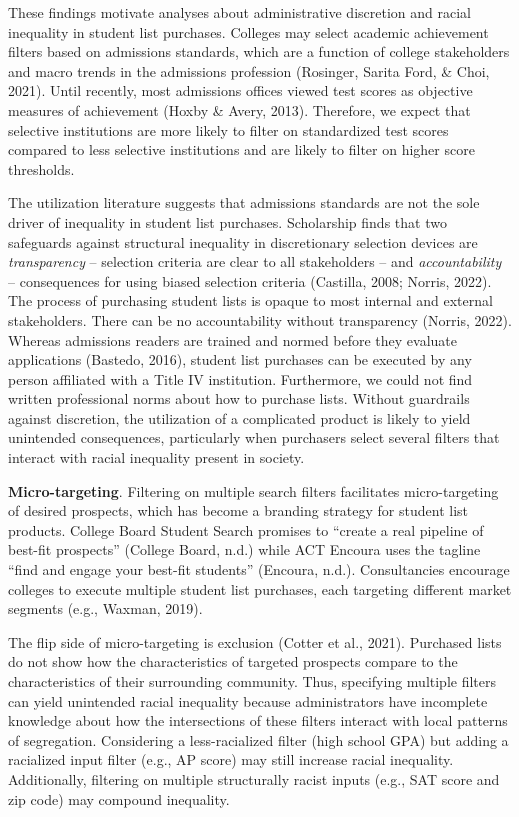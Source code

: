 \documentclass[
  12pt,
]{article}
\begin{document}
These findings motivate analyses about administrative discretion and racial inequality in student list purchases. Colleges may select academic achievement filters based on admissions standards, which are a function of college stakeholders and macro trends in the admissions profession (Rosinger, Sarita Ford, \& Choi, 2021). Until recently, most admissions offices viewed test scores as objective measures of achievement (Hoxby \& Avery, 2013). Therefore, we expect that selective institutions are more likely to filter on standardized test scores compared to less selective institutions and are likely to filter on higher score thresholds.

The utilization literature suggests that admissions standards are not the sole driver of inequality in student list purchases. Scholarship finds that two safeguards against structural inequality in discretionary selection devices are \emph{transparency} -- selection criteria are clear to all stakeholders -- and \emph{accountability} -- consequences for using biased selection criteria (Castilla, 2008; Norris, 2022). The process of purchasing student lists is opaque to most internal and external stakeholders. There can be no accountability without transparency (Norris, 2022). Whereas admissions readers are trained and normed before they evaluate applications (Bastedo, 2016), student list purchases can be executed by any person affiliated with a Title IV institution. Furthermore, we could not find written professional norms about how to purchase lists. Without guardrails against discretion, the utilization of a complicated product is likely to yield unintended consequences, particularly when purchasers select several filters that interact with racial inequality present in society.

\textbf{Micro-targeting}. Filtering on multiple search filters facilitates micro-targeting of desired prospects, which has become a branding strategy for student list products. College Board Student Search promises to ``create a real pipeline of best-fit prospects'' (College Board, n.d.) while ACT Encoura uses the tagline ``find and engage your best-fit students'' (Encoura, n.d.). Consultancies encourage colleges to execute multiple student list purchases, each targeting different market segments (e.g., Waxman, 2019).

The flip side of micro-targeting is exclusion (Cotter et al., 2021). Purchased lists do not show how the characteristics of targeted prospects compare to the characteristics of their surrounding community. Thus, specifying multiple filters can yield unintended racial inequality because administrators have incomplete knowledge about how the intersections of these filters interact with local patterns of segregation. Considering a less-racialized filter (high school GPA) but adding a racialized input filter (e.g., AP score) may still increase racial inequality. Additionally, filtering on multiple structurally racist inputs (e.g., SAT score and zip code) may compound inequality.
\end{document}
